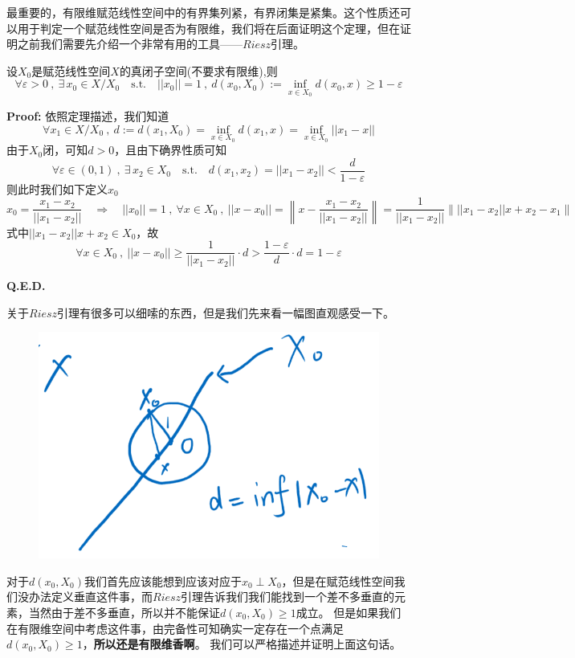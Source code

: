 最重要的，有限维赋范线性空间中的有界集列紧，有界闭集是紧集。这个性质还可以用于判定一个赋范线性空间是否为有限维，我们将在后面证明这个定理，但在证明之前我们需要先介绍一个非常有用的工具——$Riesz$引理。
\begin{theorem}[$Riesz$引理]\label{Riesz}
    设$X_0$是赋范线性空间$X$的真闭子空间(不要求有限维),则
    \[\forall \varepsilon>0 \ , \ \exists \, x_0 \in X / X_0 \quad \text{s.t.} \quad ||x_0||=1 \ , \ d(x_0,X_0):=\mathop \text{inf}\limits_{x \in X_0}d(x_0,x) \geq 1-\varepsilon\]
\end{theorem}
\textbf{Proof:} 依照定理描述，我们知道
\[\forall x_1 \in X/X_0 \ , \ d:=d(x_1,X_0)=\mathop \text{inf}\limits_{x \in X_0}d(x_1,x)=\mathop \text{inf}\limits_{x \in X_0}||x_1-x||\]
由于$X_0$闭，可知$d>0$，且由下确界性质可知
\[\forall \varepsilon \in (0,1) \ , \ \exists \, x_2 \in X_0 \quad \text{s.t.} \quad d(x_1,x_2)=||x_1-x_2||<\frac{d}{1-\varepsilon}\]
则此时我们如下定义$x_0$
\[x_0=\frac{x_1-x_2}{||x_1-x_2||} \quad \Rightarrow \quad ||x_0||=1 \ , \ \forall x \in X_0 \ , \ ||x-x_0||=\left\|x-\frac{x_1-x_2}{||x_1-x_2||}\right\|=\frac{1}{||x_1-x_2||}\left\|||x_1-x_2||x+x_2-x_1\right\|\]
式中$||x_1-x_2||x+x_2 \in X_0$，故
\[\forall x \in X_0 \ , \ ||x-x_0|| \geq \frac{1}{||x_1-x_2||} \cdot d >\frac{1-\varepsilon}{d} \cdot d=1-\varepsilon\]

\textbf{Q.E.D.}

关于$Riesz$引理有很多可以细嗦的东西，但是我们先来看一幅图直观感受一下。
\begin{figure}[H]
    \center
    \includegraphics[scale=0.25]{./fig/3.5-1.png}
\end{figure}

对于$d(x_0,X_0)$我们首先应该能想到应该对应于$x_0 \perp X_0$，但是在赋范线性空间我们没办法定义垂直这件事，而$Riesz$引理告诉我们我们能找到一个差不多垂直的元素，当然由于差不多垂直，所以并不能保证$d(x_0,X_0) \geq 1$成立。
但是如果我们在有限维空间中考虑这件事，由完备性可知确实一定存在一个点满足$d(x_0,X_0) \geq 1$，\textbf{所以还是有限维香啊}。
我们可以严格描述并证明上面这句话。

